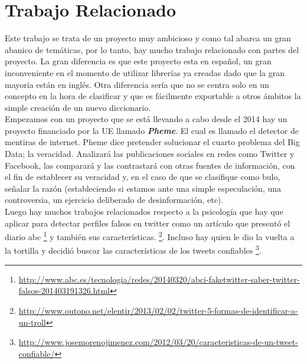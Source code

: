 \documentclass[../all.tex]{subfiles}
\begin{document}
\section{Trabajo Relacionado} %
    
    Este trabajo se trata de un proyecto muy ambicioso y como tal abarca un gran abanico de temáticas, por lo tanto, hay mucho trabajo relacionado con partes del proyecto. La gran diferencia es que este proyecto esta en español, un gran inconveniente en el momento de utilizar librerías ya creadas dado que la gran mayoría están en inglés. Otra diferencia sería que no se centra solo en un concepto en la hora de clasificar y que es fácilmente exportable a otros ámbitos la simple creación de un nuevo diccionario.\\
    
    Empezamos con un proyecto que se está llevando a cabo desde el 2014 hay un proyecto financiado por la UE llamado \textbf{\textit{Pheme}}. El cual es llamado el detector de mentiras de internet. Pheme dice pretender solucionar el cuarto problema del Big Data; la veracidad. Analizará las publicaciones sociales en redes como Twitter y Facebook, las comparará y las contrastará con otras fuentes de información, con el fin de establecer su veracidad y, en el caso de que se clasifique como bulo, señalar la razón (estableciendo si estamos ante una simple especulación, una controversia, un ejercicio deliberado de desinformación, etc).\\

    Luego hay muchos trabajos relacionados respecto a la psicología que hay que aplicar para detectar perfiles falsos en twitter como un artículo que presentó el diario abc 
    \footnote{\tiny\url{http://www.abc.es/tecnologia/redes/20140320/abci-faketwitter-saber-twitter-falsos-201403191326.html}\cite{relacionado2}} y también sus características.
    \footnote{\tiny\url{http://www.outono.net/elentir/2013/02/02/twitter-5-formas-de-identificar-a-un-troll}\cite{relacionado3}}. Incluso hay quien le dio la vuelta a la tortilla y decidió buscar las características de los tweets confiables \footnote{\tiny\url{http://www.josemorenojimenez.com/2012/03/20/caracteristicas-de-un-tweet-confiable/}}.\\
\end{document}
